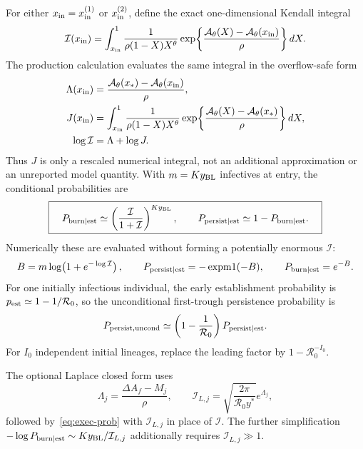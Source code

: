 \documentclass[11pt,a4paper]{article}
\newcommand{\Rzero}{\mathcal R_0}
\newcommand{\Afun}{\mathcal A_\theta}
\newcommand{\BL}{y_{\rm BL}}
\newcommand{\xs}{x_*}
\begin{document}
For either $x_{\rm in}=x_{\rm in}^{(1)}$ or $x_{\rm in}^{(2)}$, define the exact
one-dimensional Kendall integral
\begin{equation}
 \mathcal I(x_{\rm in})=\int_{x_{\rm in}}^1
 \frac{1}{\rho(1-X)X^\theta}
 \exp\!\left\{\frac{\Afun(X)-\Afun(x_{\rm in})}{\rho}\right\}dX.
 \label{eq:exec-Kendall}
\end{equation}
The production calculation evaluates the same integral in the overflow-safe
form
\begin{align}
 \Lambda(x_{\rm in})
 &=\frac{\Afun(\xs)-\Afun(x_{\rm in})}{\rho},\nonumber\\
 J(x_{\rm in})
 &=\int_{x_{\rm in}}^1
 \frac{1}{\rho(1-X)X^\theta}
 \exp\!\left\{\frac{\Afun(X)-\Afun(\xs)}{\rho}\right\}dX,\nonumber\\
 \log\mathcal I&=\Lambda+\log J.
 \label{eq:exec-Kendall-scaled}
\end{align}
Thus $J$ is only a rescaled numerical integral, not an additional
approximation or an unreported model quantity.
With $m=K\BL$ infectives at entry, the conditional probabilities are
\begin{equation}
 \boxed{\quad P_{\rm burn\mid est}\simeq
 \left(\frac{\mathcal I}{1+\mathcal I}\right)^{K\BL},
 \qquad
 P_{\rm persist\mid est}\simeq1-P_{\rm burn\mid est}.\quad}
 \label{eq:exec-prob}
\end{equation}
Numerically these are evaluated without forming a potentially enormous
$\mathcal I$:
\begin{equation}
 B=m\log\!\left(1+e^{-\log\mathcal I}\right),
 \qquad
 P_{\rm persist\mid est}=-\operatorname{expm1}(-B),
 \qquad P_{\rm burn\mid est}=e^{-B}.
 \label{eq:exec-prob-stable}
\end{equation}
For one initially infectious individual, the early establishment probability
is $p_{\rm est}\simeq1-1/\Rzero$, so the unconditional first-trough persistence
probability is
\begin{equation}
 P_{\rm persist,uncond}\simeq
 \left(1-\frac1{\Rzero}\right)P_{\rm persist\mid est}.
 \label{eq:exec-uncond}
\end{equation}
For $I_0$ independent initial lineages, replace the leading factor by
$1-\Rzero^{-I_0}$.

The optional Laplace closed form uses
\begin{equation}
 \Lambda_j=\frac{\Delta A_f-M_j}{\rho},
 \qquad
 \mathcal I_{L,j}=\sqrt{\frac{2\pi}{\Rzero y^*}}e^{\Lambda_j},
 \label{eq:exec-Laplace}
\end{equation}
followed by~\eqref{eq:exec-prob} with $\mathcal I_{L,j}$ in place of
$\mathcal I$.  The further simplification
$-\log P_{\rm burn\mid est}\sim K\BL/\mathcal I_{L,j}$ additionally requires
$\mathcal I_{L,j}\gg1$.
\end{document}
